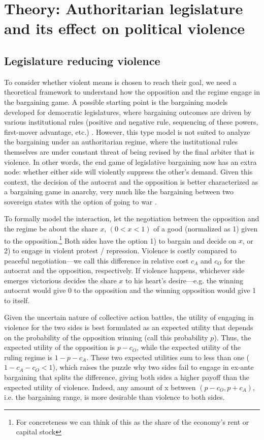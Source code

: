 \section{Theory: Authoritarian legislature and its effect on political violence}
\label{sec:theory}

\subsection{Legislature reducing violence}

To consider whether violent means is chosen to reach their goal, we need a theoretical framework to understand how the opposition and the regime engage in the bargaining game. A possible starting point is the bargaining models developed for democratic legislatures, where bargaining outcomes are driven by various institutional rules (positive and negative rule, sequencing of these powers, first-mover advantage, etc.) \citep{Baron1989, Cox2006}. However, this type model is not suited to analyze the bargaining under an authoritarian regime, where the institutional rules themselves are under constant threat of being revised by the final arbiter that is violence. In other words, the end game of legislative bargaining now has an extra node: whether either side will violently suppress the other's demand. Given this context, the decision of the autocrat and the opposition is better characterized as a bargaining game in anarchy, very much like the bargaining between two sovereign states with the option of going to war \citep{Fearon1995}.

To formally model the interaction, let the negotiation between the opposition and the regime be about the share $x$, $(0 < x < 1)$ of a good (normalized as 1) given to the opposition.\footnote{For concreteness we can think of this as the share of the economy’s rent or capital stock} Both sides have the option 1) to bargain and decide on $x$, or 2) to engage in violent protest / repression. Violence is costly compared to peaceful negotiation---we call this difference in relative cost $c_A$ and $c_O$ for the autocrat and the opposition, respectively. If violence happens, whichever side emerges victorious decides the share $x$ to his heart’s desire---e.g. the winning autocrat would give 0 to the opposition and the winning opposition would give 1 to itself.

Given the uncertain nature of collective action battles, the utility of engaging in violence for the two sides is best formulated as an expected utility that depends on the probability of the opposition winning (call this probability $p$). Thus, the expected utility of the opposition is $p - c_O$, while the expected utility of the ruling regime is $1 - p - c_A$. These two expected utilities sum to less than one ($1 - c_A - c_O < 1$), which raises the puzzle why two sides fail to engage in ex-ante bargaining that splits the difference, giving both sides a higher payoff than the expected utility of violence. Indeed, any amount of x between $(p - c_O, p + c_A)$, i.e. the bargaining range, is more desirable than violence to both sides.


